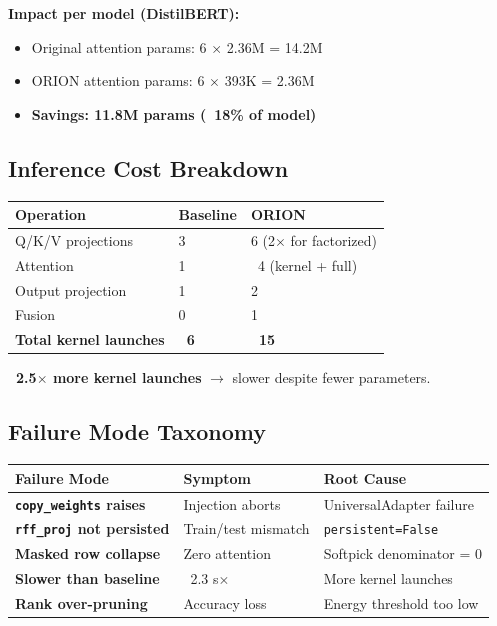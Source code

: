 \textbf{Impact per model (DistilBERT):}
\begin{itemize}
\item Original attention params: 6 $\times$ 2.36M = 14.2M
\item ORION attention params: 6 $\times$ 393K = 2.36M
\item \textbf{Savings: 11.8M params (~18\% of model)}

\end{itemize}
\subsection{Inference Cost Breakdown}

\begin{table}[H]
\centering
\small
\begin{tabular}{lll}
\toprule
\textbf{Operation} & \textbf{Baseline} & \textbf{ORION} \\
\midrule
Q/K/V projections & 3 & 6 (2$\times$ for factorized) \\
Attention & 1 & ~4 (kernel + full) \\
Output projection & 1 & 2 \\
Fusion & 0 & 1 \\
\textbf{Total kernel launches} & \textbf{~6} & \textbf{~15} \\
\bottomrule
\end{tabular}
\end{table}

\textbf{~2.5$\times$ more kernel launches} $\to$ slower despite fewer parameters.

\subsection{Failure Mode Taxonomy}

\begin{table}[H]
\centering
\small
\begin{tabular}{lll}
\toprule
\textbf{Failure Mode} & \textbf{Symptom} & \textbf{Root Cause} \\
\midrule
\textbf{\texttt{copy\_weights} raises} & Injection aborts & UniversalAdapter failure \\
\textbf{\texttt{rff\_proj} not persisted} & Train/test mismatch & \texttt{persistent=False} \\
\textbf{Masked row collapse} & Zero attention & Softpick denominator = 0 \\
\textbf{Slower than baseline} & ~2.3 s$\times$ & More kernel launches \\
\textbf{Rank over-pruning} & Accuracy loss & Energy threshold too low \\
\bottomrule
\end{tabular}
\end{table}

